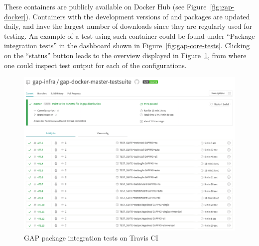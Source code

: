 These containers are publicly available on Docker Hub (see Figure~\ref{fig:gap-docker}).
Containers with the development versions of \GAP and packages are updated daily, and have
the largest number of downloads since they are regularly used for testing. An example of
a test using such container could be found under ``Package integration
tests'' in the dashboard shown in 
Figure~\ref{fig:gap-core-tests}. Clicking on the ``status'' button leads to the overview displayed
in Figure~\ref{fig:gap-docker-master-testsuite}, from where one could inspect
test output for each of the configurations. 

\begin{figure}[!ht]
    \centering
    \includegraphics[width=\textwidth]{images/gap-docker-master-testsuite}
    \caption{GAP package integration tests on Travis CI}
    \label{fig:gap-docker-master-testsuite}
\end{figure}


